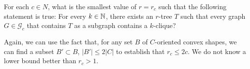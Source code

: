 \documentclass[lotsofwhite]{patmorin}
\begin{document}
\begin{op}
   For each $c\in N$, what is the smallest value of $r=r_c$ such that the
   following statement is true: For every $k\in\mathbb{N}$, there exists an
   $r$-tree $T$ such that every graph $G\in\mathcal{G}_c$ that contains
   $T$ as a subgraph contains a $k$-clique?
\end{op}

Again, we can use the fact that, for any set $B$ of $C$-oriented convex
shapes, we can find a subset $B'\subset B$, $|B'|\le 2|C|$ to establish
that $r_c \le 2c$.  We do not know a lower bound better than $r_c > 1$.



\end{document}
